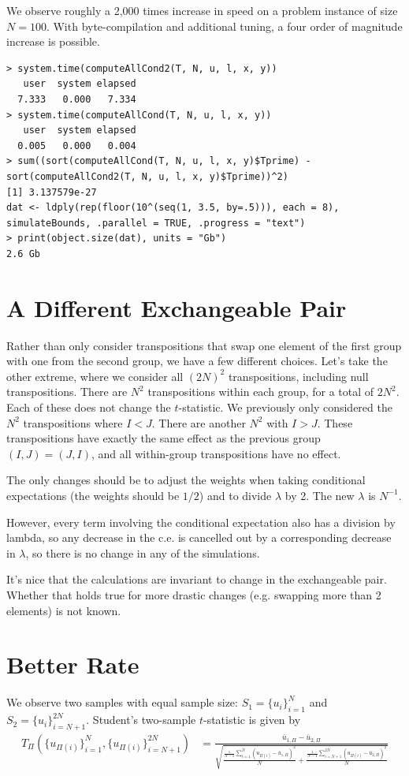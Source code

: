 We observe roughly a 2,000 times increase in speed on a problem instance of size $N=100$.  With
byte-compilation and additional tuning, a four order of magnitude increase is possible.
\begin{verbatim}
> system.time(computeAllCond2(T, N, u, l, x, y))
   user  system elapsed
  7.333   0.000   7.334
> system.time(computeAllCond(T, N, u, l, x, y))
   user  system elapsed
  0.005   0.000   0.004
> sum((sort(computeAllCond(T, N, u, l, x, y)$Tprime) - sort(computeAllCond2(T, N, u, l, x, y)$Tprime))^2)
[1] 3.137579e-27
dat <- ldply(rep(floor(10^(seq(1, 3.5, by=.5))), each = 8),
simulateBounds, .parallel = TRUE, .progress = "text")
> print(object.size(dat), units = "Gb")
2.6 Gb
\end{verbatim}

\section{A Different Exchangeable Pair}
Rather than only consider transpositions that swap one element of the
first group with one from the second group, we have a few different
choices.  Let's take the other extreme, where we consider all $(2N)^2$
transpositions, including null transpositions.  There are $N^2$
transpositions within each group, for a total of $2N^2$.  Each of
these does not change the $t$-statistic.  We previously only
considered the $N^2$ transpositions where $I < J$.  There are another
$N^2$ with $I > J$.  These transpositions have exactly the same effect
as the previous group $(I, J) = (J, I)$, and all within-group
transpositions have no effect.

The only changes should be to adjust the weights when taking
conditional expectations (the weights should be $1/2$) and to divide
$\lambda$ by 2.  The new $\lambda$ is $N^{-1}$.

However, every term involving the conditional expectation also has a
division by lambda, so any decrease in the c.e. is cancelled out by a
corresponding decrease in $\lambda$, so there is no change in any of
the simulations.

It's nice that the calculations are invariant to change in the
exchangeable pair.  Whether that holds true for more drastic changes
(e.g. swapping more than 2 elements) is not known.

\section{Better Rate}
We observe two samples with equal sample size: $S_1 = \{u_i\}_{i=1}^N$ and $S_2 =
\{u_i\}_{i=N+1}^{2N}$.
Student's two-sample $t$-statistic is given by
\begin{align*}
T_{\Pi}(\{u_{\Pi(i)}\}_{i=1}^N, \{u_{\Pi(i)}\}_{i=N+1}^{2N})
&= \frac{\bar{u}_{1,\Pi} - \bar{u}_{2,\Pi}}{\sqrt{\frac{\frac{1}{N-1}
      \sum_{i=1}^N(u_{\Pi(i)} - \bar{u}_{1,\Pi})^2}{N} + \frac{\frac{1}{N-1}
      \sum_{i=N+1}^{2N}(u_{\Pi(i)} - \bar{u}_{2,\Pi})^2}{N}}} \\
\end{align*}

